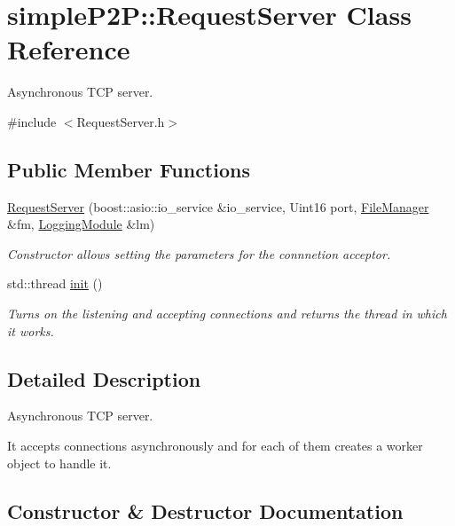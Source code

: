 \hypertarget{classsimpleP2P_1_1RequestServer}{}\section{simple\+P2P\+:\+:Request\+Server Class Reference}
\label{classsimpleP2P_1_1RequestServer}


Asynchronous T\+CP server.  




{\ttfamily \#include $<$Request\+Server.\+h$>$}

\subsection*{Public Member Functions}
\begin{DoxyCompactItemize}
\item 
\hyperlink{classsimpleP2P_1_1RequestServer_a66d8609132bfc064a3b40b6264d8f68d}{Request\+Server} (boost\+::asio\+::io\+\_\+service \&io\+\_\+service, Uint16 port, \hyperlink{classsimpleP2P_1_1FileManager}{File\+Manager} \&fm, \hyperlink{classsimpleP2P_1_1LoggingModule}{Logging\+Module} \&lm)
\begin{DoxyCompactList}\small\item\em Constructor allows setting the parameters for the connnetion acceptor. \end{DoxyCompactList}\item 
\mbox{\label{classsimpleP2P_1_1RequestServer_a6a111e7a8ca8e7d94cc5f70382379bc7}} 
std\+::thread \hyperlink{classsimpleP2P_1_1RequestServer_a6a111e7a8ca8e7d94cc5f70382379bc7}{init} ()
\begin{DoxyCompactList}\small\item\em Turns on the listening and accepting connections and returns the thread in which it works. \end{DoxyCompactList}\end{DoxyCompactItemize}


\subsection{Detailed Description}
Asynchronous T\+CP server. 

It accepts connections asynchronously and for each of them creates a worker object to handle it. 

\subsection{Constructor \& Destructor Documentation}
\mbox{\label{classsimpleP2P_1_1RequestServer_a66d8609132bfc064a3b40b6264d8f68d}} 

